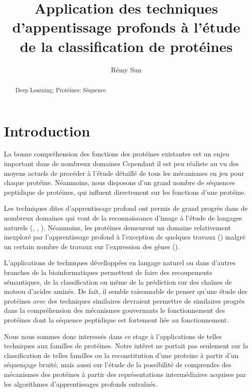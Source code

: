 \documentclass[a4paper,11pt]{article}
\title{Application des techniques d'appentissage profonds à l'étude de la
  classification de protéines}
\author{Rémy Sun}
\newenvironment{keywords}%
{\description\item[Mots-clés.]}%
{\enddescription}
\begin{document}
\maketitle

\begin{abstract}
  
  \begin{keywords}
    Deep Learning; Protéines; Séquence
  \end{keywords}
\end{abstract}

\section*{Introduction}

La bonne compréhension des fonctions des protéines existantes est un enjeu
important dans de nombreux domaines %
Cependant il est peu réaliste au vu des moyens actuels de procéder à l'étude
détaillé de tous les mécanismes en jeu pour chaque protéine. Néanmoins, nous
disposons d'un grand nombre de séquences peptidique de protéines, qui influent
directement sur les fonctions d'une protéine.

Les techniques dites d'apprentissage profond ont permis de grand progrès dans de
nombreux domaines qui vont de la reconnaissance d'image à l'étude de langages
naturels (\cite{DBLP:journals/corr/ChoMGBSB14}, \cite{socher2011semi}, \cite{NIPS2014_5346}). Néanmoins, les
protéines demeurent un domaine relativement inexploré par l'apprentissage
profond à l'exception de quelques travaux
(\cite{Spencer:2015:DLN:2817095.2817106}) malgré un certain nombre de travaux
sur l'expression des gènes (\cite{Gupta031906}).

L'applications de techniques dévelloppées en langage naturel ou dans d'autres
branches de la bioinformatiques permettent de faire des recoupements sémantiques,
de la classification ou même de la prédiction sur des chaînes de \og mots\fg ou
d'acides aminés. De fait, il semble raisonnable de penser qu'une étude des
protéines avec des techniques similaires devraient permettre de similaires
progrès dans la compréhension des mécanismes gouvernants le fonctionnement des
protéines dont la séquence peptidique est fortement liée au fonctionnement.

Nous nous sommes donc interessés dans ce stage à l'applications de telles techniques
aux familles de protéines. Notre intêret ne portait pas seulement sur la
classification de telles familles ou la reconstitution d'une proteine à partir
d'un séquençage bruité, mais aussi sur l'étude de la possibilité de comprendre
des mécanismes des protéines à partir des représentations intermédiaires acquises par les
algorithmes d'apprentissages profonds entraînés.
\end{document}
